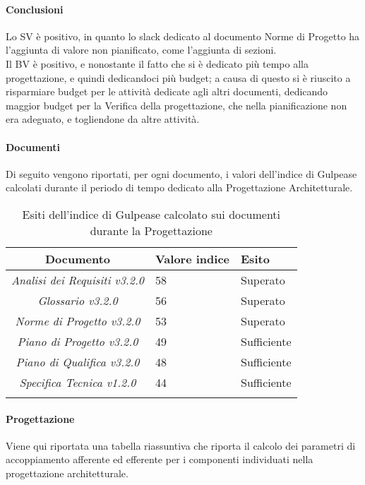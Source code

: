 \paragraph{Conclusioni}
Lo SV è positivo, in quanto lo slack dedicato al documento Norme di Progetto ha  l'aggiunta di valore non pianificato, come l'aggiunta di sezioni.\\
Il BV è positivo, e nonostante il fatto che si è dedicato più tempo alla progettazione, e quindi dedicandoci più budget; a causa di questo si è riuscito a risparmiare budget per le attività dedicate agli altri documenti, dedicando maggior budget per la Verifica della progettazione, che nella pianificazione non era adeguato, e togliendone da altre attività.

\paragraph{Documenti}
Di seguito vengono riportati, per ogni documento, i valori dell'indice di Gulpease calcolati durante il periodo di tempo dedicato alla Progettazione Architetturale.

\begin{longtable}{|c|p{3cm}|p{3cm}|}
\toprule
\textbf{Documento} & \textbf{Valore indice} & \textbf{Esito} \\


\midrule
\emph{Analisi dei Requisiti v3.2.0} & 58 & Superato \\
\midrule
\emph{Glossario v3.2.0} & 56 & Superato \\
\midrule
\emph{Norme di Progetto v3.2.0} & 53  & Superato\\
\midrule
\emph{Piano di Progetto v3.2.0} & 49  & Sufficiente\\
\midrule
\emph{Piano di Qualifica v3.2.0} & 48  & Sufficiente\\
\midrule
\emph{Specifica Tecnica v1.2.0} & 44 & Sufficiente\\
\bottomrule
\caption{Esiti dell'indice di Gulpease calcolato sui documenti durante la Progettazione}
\label{tab:changelog}
\end{longtable}

\paragraph{Progettazione}
Viene qui riportata una tabella riassuntiva che riporta il calcolo dei parametri di accoppiamento afferente ed efferente per i componenti individuati nella progettazione architetturale.

